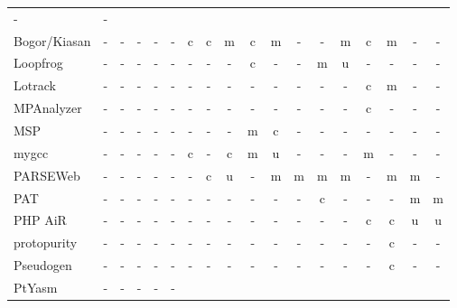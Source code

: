 \begin{longtable}{ l *{17}{c} }
      - &
      - \\
    Bogor/Kiasan &
      - &
      - &
      - &
      - &
      - &
      c &
      c &
      m &
      c &
      m &
      - &
      - &
      m &
      c &
      m &
      - &
      - \\
    Loopfrog &
      - &
      - &
      - &
      - &
      - &
      - &
      - &
      - &
      c &
      - &
      - &
      m &
      u &
      - &
      - &
      - &
      - \\
    Lotrack &
      - &
      - &
      - &
      - &
      - &
      - &
      - &
      - &
      - &
      - &
      - &
      - &
      - &
      c &
      m &
      - &
      - \\
    MPAnalyzer &
      - &
      - &
      - &
      - &
      - &
      - &
      - &
      - &
      - &
      - &
      - &
      - &
      - &
      c &
      - &
      - &
      - \\
    MSP &
      - &
      - &
      - &
      - &
      - &
      - &
      - &
      - &
      m &
      c &
      - &
      - &
      - &
      - &
      - &
      - &
      - \\
    mygcc &
      - &
      - &
      - &
      - &
      - &
      c &
      - &
      c &
      m &
      u &
      - &
      - &
      - &
      m &
      - &
      - &
      - \\
    PARSEWeb &
      - &
      - &
      - &
      - &
      - &
      - &
      c &
      u &
      - &
      m &
      m &
      m &
      m &
      - &
      m &
      m &
      - \\
    PAT &
      - &
      - &
      - &
      - &
      - &
      - &
      - &
      - &
      - &
      - &
      - &
      c &
      - &
      - &
      - &
      m &
      m \\
    PHP AiR &
      - &
      - &
      - &
      - &
      - &
      - &
      - &
      - &
      - &
      - &
      - &
      - &
      - &
      c &
      c &
      u &
      u \\
    protopurity &
      - &
      - &
      - &
      - &
      - &
      - &
      - &
      - &
      - &
      - &
      - &
      - &
      - &
      - &
      c &
      - &
      - \\
    Pseudogen &
      - &
      - &
      - &
      - &
      - &
      - &
      - &
      - &
      - &
      - &
      - &
      - &
      - &
      - &
      c &
      - &
      - \\
    PtYasm &
      - &
      - &
      - &
      - &
      - &

\end{longtable}
